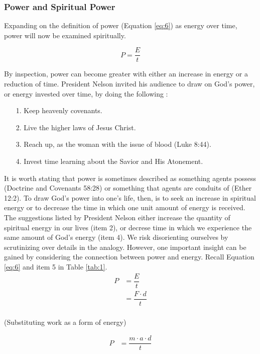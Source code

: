 \documentclass{article}
\begin{document}
            \subsubsection{Power and Spiritual Power}
                Expanding on the definition of power (Equation \ref{eq:6}) as energy over time, power will now be examined spiritually.
                
                \[P = \dfrac{E}{t}\]

                By inspection, power can become greater with either an increase in energy or a reduction of time. President Nelson invited his audience to draw on God's power, or energy invested over time, by doing the following \cite{Nelson2}:

                \begin{enumerate}
                    \item[1.] Keep heavenly covenants.
                    \item[2.] Live the higher laws of Jesus Christ.
                    \item[3.] Reach up, as the woman with the issue of blood (Luke 8:44).
                    \item[4.] Invest time learning about the Savior and His Atonement.
                \end{enumerate}

                It is worth stating that power is sometimes described as something agents possess (Doctrine and Covenants 58:28) or something that agents are conduits of (Ether 12:2). 
                To draw God's power into one's life, then, is to seek an increase in spiritual energy or to decrease the time in which one unit amount of energy is received. 
                The suggestions listed by President Nelson either increase the quantity of spiritual energy in our lives (item 2), or decrese time in which we experience the same amount of God's energy (item 4).
                We risk disorienting ourselves by scrutinizing over details in the analogy. However, one important insight can be gained by considering the connection between power and energy.
                Recall Equation \ref{eq:6} and item 5 in Table \ref{tab:1}.
                \begin{equation}
                    \begin{split}
                        P & = \dfrac{E}{t}\\
                        & = \dfrac{F \cdot d}{t}\\
                    \end{split}
                \end{equation}
                \begin{center}
                    (Substituting work as a form of energy)
                \end{center}
                \begin{equation}
                    \begin{split}
                        P & = \dfrac{m \cdot a \cdot d}{t}\\
                    \end{split}
                \end{equation}
                
\end{document}
